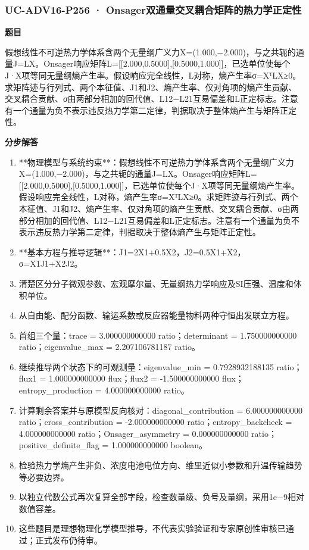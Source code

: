 \documentclass[UTF8,11pt,a4paper]{ctexart}
\begin{document}
\subsubsection*{UC-ADV16-P256 · Onsager双通量交叉耦合矩阵的热力学正定性}
\noindent\textbf{题目}\par
假想线性不可逆热力学体系含两个无量纲广义力X=(1.000,−2.000)，与之共轭的通量J=LX。Onsager响应矩阵L=[[2.000,0.5000],[0.5000,1.000]]，已选单位使每个J·X项等同无量纲熵产生率。假设响应完全线性，L对称，熵产生率σ=XᵀLX≥0。求矩阵迹与行列式、两个本征值、J1和J2、熵产生率、仅对角项的熵产生贡献、交叉耦合贡献、σ由两部分相加的回代值、L12−L21互易偏差和L正定标志。注意有一个通量为负不表示违反热力学第二定律，判据取决于整体熵产生与矩阵正定性。\par
\medskip\noindent\textbf{分步解答}
\begin{enumerate}
\item **物理模型与系统约束**：假想线性不可逆热力学体系含两个无量纲广义力X=(1.000,−2.000)，与之共轭的通量J=LX。Onsager响应矩阵L=[[2.000,0.5000],[0.5000,1.000]]，已选单位使每个J·X项等同无量纲熵产生率。假设响应完全线性，L对称，熵产生率σ=XᵀLX≥0。求矩阵迹与行列式、两个本征值、J1和J2、熵产生率、仅对角项的熵产生贡献、交叉耦合贡献、σ由两部分相加的回代值、L12−L21互易偏差和L正定标志。注意有一个通量为负不表示违反热力学第二定律，判据取决于整体熵产生与矩阵正定性。
\item **基本方程与推导逻辑**：J1=2X1+0.5X2，J2=0.5X1+X2，σ=X1J1+X2J2。
\item 清楚区分分子微观参数、宏观摩尔量、无量纲热力学响应及SI压强、温度和体积单位。
\item 从自由能、配分函数、输运系数或反应器能量物料两种守恒出发联立方程。
\item 首组三个量：trace = 3.000000000000 ratio；determinant = 1.750000000000 ratio；eigenvalue\_max = 2.207106781187 ratio。
\item 继续推导两个状态下的可观测量：eigenvalue\_min = 0.7928932188135 ratio；flux1 = 1.000000000000 flux；flux2 = -1.500000000000 flux；entropy\_production = 4.000000000000 ratio。
\item 计算剩余答案并与原模型反向核对：diagonal\_contribution = 6.000000000000 ratio；cross\_contribution = -2.000000000000 ratio；entropy\_backcheck = 4.000000000000 ratio；Onsager\_asymmetry = 0.000000000000 ratio；positive\_definite\_flag = 1.000000000000 boolean。
\item 检验热力学熵产生非负、浓度电池电位方向、维里近似小参数和升温传输趋势等必要边界。
\item 以独立代数公式再次复算全部字段，检查数量级、负号及量纲，采用1e−9相对数值容差。
\item 这些题目是理想物理化学模型推导，不代表实验验证和专家原创性审核已通过；正式发布仍待审。
\end{enumerate}
\end{document}

